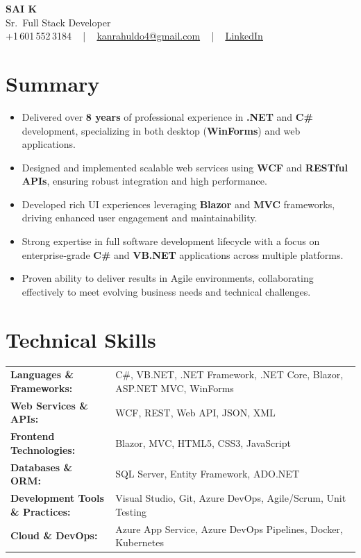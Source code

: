 \documentclass[letterpaper,11pt]{article}
\newcommand{\resumeItem}[1]{
  \item\footnotesize{
    {#1 \vspace{-2pt}}
  }
}
\newcommand{\resumeItemListStart}{\begin{itemize}[leftmargin=*]}
\newcommand{\resumeItemListEnd}{\end{itemize}\vspace{-5pt}}
\begin{document}
\begin{center}
    {\fontsize{14pt}{12pt}\selectfont \textbf{\MakeUppercase{Sai K}}}\\ \vspace{2pt}
    \fontsize{10pt}{12pt}\selectfont Sr.\ Full Stack Developer\\ \vspace{2pt}
    \fontsize{10pt}{12pt}\selectfont +1\,601\,552\,3184 ~ | ~
    \href{mailto:kanrahuldo4@gmail.com}{kanrahuldo4@gmail.com} ~ | ~
    \href{https://www.linkedin.com/in/srrrk/}{\color{blue}\underline{LinkedIn}}
    \vspace{-10pt}
\end{center}

\section{Summary}
\fontsize{9pt}{10pt}\selectfont
\resumeItemListStart
  \resumeItem{Delivered over \textbf{8 years} of professional experience in \textbf{.NET} and \textbf{C\#} development, specializing in both desktop (\textbf{WinForms}) and web applications.}
  \resumeItem{Designed and implemented scalable web services using \textbf{WCF} and \textbf{RESTful APIs}, ensuring robust integration and high performance.}
  \resumeItem{Developed rich UI experiences leveraging \textbf{Blazor} and \textbf{MVC} frameworks, driving enhanced user engagement and maintainability.}
  \resumeItem{Strong expertise in full software development lifecycle with a focus on enterprise-grade \textbf{C\#} and \textbf{VB.NET} applications across multiple platforms.}
  \resumeItem{Proven ability to deliver results in Agile environments, collaborating effectively to meet evolving business needs and technical challenges.}
\resumeItemListEnd
\vspace{-6pt}

\section{Technical Skills}
\vspace{-14pt}
\begin{table}[h]
\fontsize{9pt}{10pt}\selectfont
\begin{tabular}{p{0.3\linewidth} p{0.7\linewidth}}
\textbf{Languages \& Frameworks:} & C\#, VB.NET, .NET Framework, .NET Core, Blazor, ASP.NET MVC, WinForms \\
\textbf{Web Services \& APIs:} & WCF, REST, Web API, JSON, XML \\
\textbf{Frontend Technologies:} & Blazor, MVC, HTML5, CSS3, JavaScript \\
\textbf{Databases \& ORM:} & SQL Server, Entity Framework, ADO.NET \\
\textbf{Development Tools \& Practices:} & Visual Studio, Git, Azure DevOps, Agile/Scrum, Unit Testing \\
\textbf{Cloud \& DevOps:} & Azure App Service, Azure DevOps Pipelines, Docker, Kubernetes \\
\end{tabular}
\end{table}
\vspace{-15pt}
\end{document}

